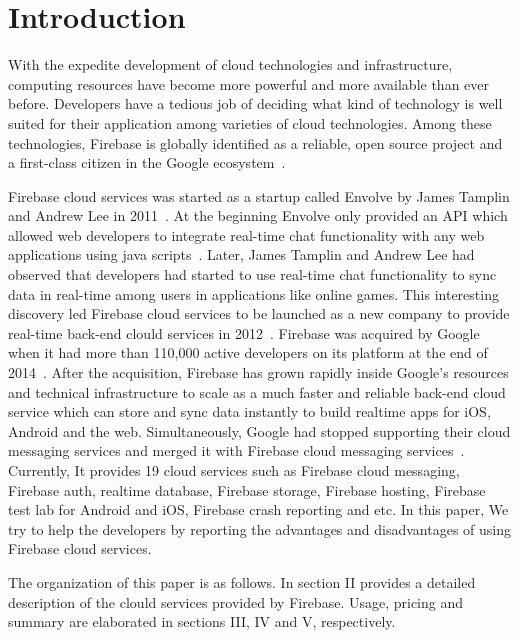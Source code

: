\section{Introduction}

With the expedite development of cloud technologies and
infrastructure, computing resources have become more powerful and more
available than ever before.  Developers have a tedious job of deciding
what kind of technology is well suited for their application among
varieties of cloud technologies. Among these technologies, Firebase is
globally identified as a reliable, open source project and a
first-class citizen in the Google
ecosystem~\cite{hid-sp18-409-www-firebase}.

Firebase cloud services was started as a startup called Envolve by
James Tamplin and Andrew Lee in
2011~\cite{hid-sp18-409-www-firebase-wikipedia}. At the beginning
Envolve only provided an API which allowed web developers to integrate
real-time chat functionality with any web applications using java
scripts~\cite{hid-sp18-409-www-firebase}. Later, James Tamplin and
Andrew Lee had observed that developers had started to use real-time
chat functionality to sync data in real-time among users in
applications like online games. This interesting discovery led
Firebase cloud services to be launched as a new company to provide
real-time back-end clould services in
2012~\cite{hid-sp18-409-www-firebase-wikipedia}. Firebase was acquired
by Google when it had more than 110,000 active developers on its
platform at the end of 2014~\cite{hid-sp18-409-www-firebase-acquired}.
After the acquisition, Firebase has grown rapidly inside Google's
resources and technical infrastructure to scale as a much faster and
reliable back-end cloud service which can store and sync data
instantly to build realtime apps for iOS, Android and the
web. Simultaneously, Google had stopped supporting their cloud
messaging services and merged it with Firebase cloud messaging
services~\cite{hid-sp18-409-www-firebase-merged}. Currently, It
provides 19 cloud services such as Firebase cloud messaging, Firebase
auth, realtime database, Firebase storage, Firebase hosting, Firebase
test lab for Android and iOS, Firebase crash reporting and etc. In
this paper, We try to help the developers by reporting the advantages
and disadvantages of using Firebase cloud services.

The organization of this paper is as follows. In section II
provides a detailed description of the clould services provided by
Firebase. Usage, pricing and summary are elaborated in sections III, IV
and V, respectively.



